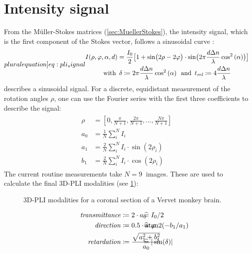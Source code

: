 \section{Intensity signal}\label{sec::intSignal}
%
From the M{\"u}ller-Stokes matrices (\cref{sec:MuellerStokes}), the intensity signal, which is the first component of the Stokes vector, follows a sinusoidal curve \cite{MenzelMaster,MenzelDissertation}:
%
\begin{align}
\label[pluralequation]{eq:pli_signal}
\centering
\begin{gathered}
I(\rho, \varphi, \alpha, d) =\frac{I_0}{2}\bigl[ 1+ \sin\bigl(2\rho - 2\varphi \bigr)\cdot \sin \bigl( 2\pi\frac{d \dn}{\lambda} \cos^2\left( \alpha \right) \bigr) \bigr] \\
\text{with} \enspace \delta \coloneqq 2\pi\frac{d \dn}{\lambda} \cos^2\left( \alpha \right) \enspace
\text{and} \enspace \trel \coloneqq 4 \frac{d \dn}{\lambda}
\end{gathered}
\end{align}
%
 describes a sinusoidal signal.
For a discrete, equidistant measurement of the rotation angles $\rho$, one can use the Fourier series with the first three coefficients to describe the signal:
%
\begin{align}
\begin{split}
\rho &= [0, \frac{\pi}{N+1}, \frac{2\pi}{N+1}, ..., \frac{N\pi}{N+1}]\\
a_0 &= \frac{1}{N} \sum_i^N I_i\\
a_1 &= \frac{2}{N} \sum_i^N I_i \cdot \sin(2 \rho_i)\\
b_1 &= \frac{2}{N} \sum_i^N I_i \cdot \cos(2 \rho_i)
\end{split}
\end{align}
%
The current routine measurements take $N=\SI{9}{}$ images.
These are used to calculate the final \ac{3D-PLI} modalities (see \cref{fig:vervetpli}):
%
\begin{figure}[!t]

\caption[3D-PLI modalities]{3D-PLI modalities for a coronal section of a Vervet monkey brain.}
\label{fig:vervetpli}
\end{figure}
%
\begin{align}
\begin{split}
\mathit{transmittance} &\coloneqq 2 \cdot a_0 \vphantom{I_0/2} \\
\mathit{direction} &\coloneqq 0.5 \cdot \atantwo(-b_1 / a_1) \vphantom{\varphi} \\
\mathit{retardation} &\coloneqq \frac{\sqrt{a_1^2 + b_1^2}}{a_0}  \vphantom{\sin(\delta)}
\end{split}
\hspace{-7em}
\begin{split}
& \mathrel{\widehat{=}} I_0/2 \vphantom{2 \cdot a_0}\\
& \mathrel{\widehat{=}} \varphi \vphantom{0.5 \cdot \atantwo(-b_1 / a_1)} \\
& \mathrel{\widehat{=}} |\sin(\delta)| \vphantom{\frac{\sqrt{a_1^2 + b_1^2}}{a_0}}
\end{split}
\end{align}
